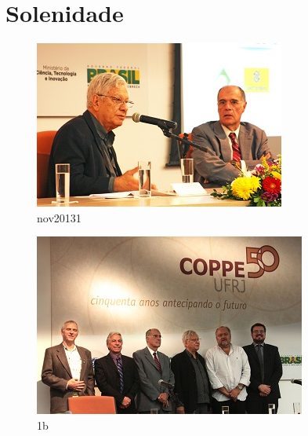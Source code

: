 \section{Solenidade}

\begin{figure}[h!]
\centering
  \includegraphics[width=1\linewidth]{Fotos/Solenidade/1.jpg}
  \caption{nov20131}
  \label{nov20131}
\end{figure}

\begin{figure}[h!]
  \centering
  \includegraphics[width=1\linewidth]{Fotos/Solenidade/2.jpg}
  \caption{1b}
  \label{nov20132}
\end{figure}

